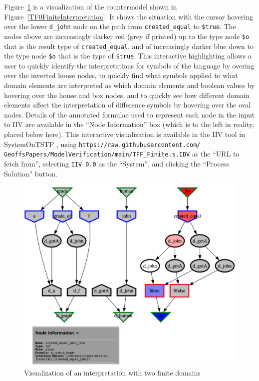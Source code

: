 \documentclass[letterpaper]{article}
\begin{document}
Figure~\ref{TF0FiniteIIV} is a visualization of the countermodel shown in 
Figure~\ref{TF0FiniteInterpretation}.
It shows the situation with the cursor hovering over the lower {\tt d\_john} node on the path
from {\tt created\_equal} to {\tt \$true}.
The nodes above are increasingly darker red (grey if printed) up to the type node {\tt \$o} that
is the result type of {\tt created\_equal}, and of increasingly darker blue down to the type 
node {\tt \$o} that is the type of {\tt \$true}.
This interactive highlighting allows a user to quickly identify the interpretations for symbols
of the language by overing over the inverted house nodes, to quickly find what symbols applied to
what domain elements are interpreted as which domain elements and boolean values by hovering over
the house and box nodes, and to quickly see how different domain elements affect the interpretation
of difference symbols by hovering over the oval nodes.
Details of the annotated formulae used to represent each node in the input to IIV are available 
in the ``Node Information'' box (which is to the left in reality, placed below here).
This interactive visualization is available in the IIV tool in SystemOnTSTP \cite{Sut07-CSR}, using 
{\scriptsize {\tt https://raw.githubusercontent.com/ GeoffsPapers/ModelVerification/main/TFF\_Finite.s.IDV}}
as the ``URL to fetch from'', selecting {\tt IIV 0.0} as the ``System'', and clicking the
``Process Solution'' button.

\begin{figure}[htbp]
\includegraphics[width=\columnwidth]{IIV.pdf}
\caption{Visualization of an interpretation with two finite domains}
\label{TF0FiniteIIV}
\end{figure}
\end{document}
